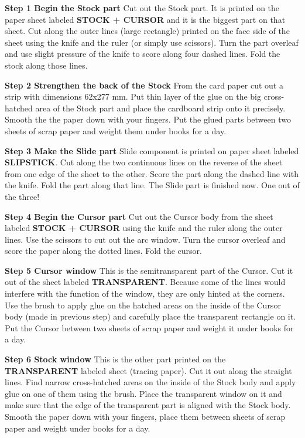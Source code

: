 \documentclass[a4paper,9pt]{article}
\begin{document}
\begin{multicols*}{3}
{  \textbf{Step 1 Begin the Stock part} Cut out the Stock part. It is printed on the paper sheet labeled \textbf{STOCK + CURSOR} and it is the biggest part on that sheet. Cut along the outer lines (large rectangle) printed on the face side of the sheet using the knife and the ruler (or simply use scissors). Turn the part overleaf and use slight pressure of the knife to score along four dashed lines. Fold the stock along those lines.

  \textbf{Step 2 Strengthen the back of the Stock} From the card paper cut out a strip with dimensions 62x277 mm. Put thin layer of the glue on the big cross-hatched area of the Stock part and place the cardboard strip onto it precisely. Smooth the the paper down with your fingers. Put the glued parts between two sheets of scrap paper and weight them under books for a day.

  \textbf{Step 3 Make the Slide part} Slide component is printed on paper sheet labeled \textbf{SLIPSTICK}. Cut along the two continuous lines on the reverse of the sheet from one edge of the sheet to the other. Score the part along the dashed line with the knife. Fold the part along that line. The Slide part is finished now. One out of the three!

  \textbf{Step 4 Begin the Cursor part} Cut out the Cursor body from the sheet labeled \textbf{STOCK + CURSOR} using the knife and the ruler along the outer lines. Use the scissors to cut out the arc window. Turn the cursor overleaf and score the paper along the dotted lines. Fold the cursor.

  \textbf{Step 5 Cursor window} This is the semitransparent part of the Cursor. Cut it out of the sheet labeled \textbf{TRANSPARENT}. Because some of the lines would interfere with the function of the window, they are only hinted at the corners. Use the brush to apply glue on the hatched areas on the inside of the Cursor body (made in previous step) and carefully place the transparent rectangle on it. Put the Cursor between two sheets of scrap paper and weight it under books for a day.

  \textbf{Step 6 Stock window} This is the other part printed on the \textbf{TRANSPARENT} labeled sheet (tracing paper). Cut it out along the straight lines. Find narrow cross-hatched areas on the inside of the Stock body and apply glue on one of them using the brush. Place the transparent window on it and make sure that the edge of the transparent part is aligned with the Stock body. Smooth the paper down with your fingers, place them between sheets of scrap paper and weight under books for a day.

}
\end{multicols*}
\end{document}
